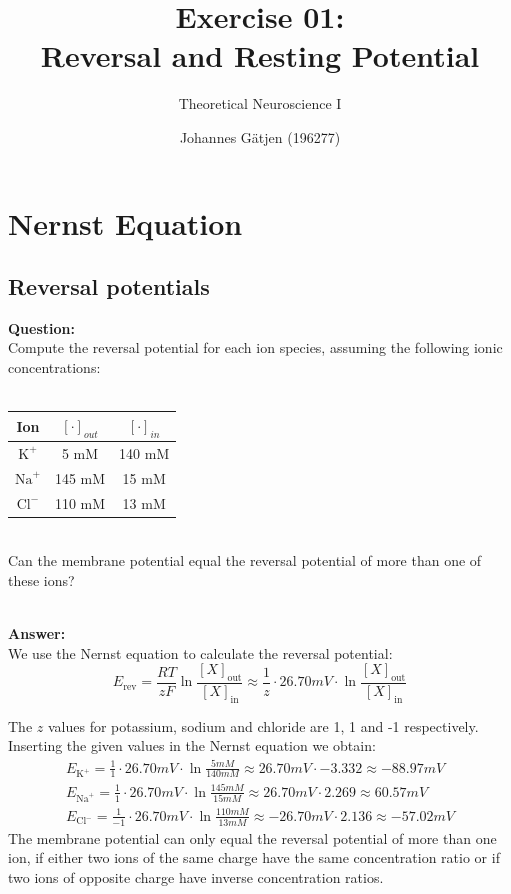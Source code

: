 \documentclass{scrartcl}
\title{Exercise 01:\\Reversal and Resting Potential}
\subtitle{Theoretical Neuroscience I}
\author{Johannes G\"atjen (196277)}
\newcommand\Answer{%
  \textbf{\\Answer:}%
}
\newcommand\Question{%
  \textbf{Question:}%
}
\begin{document}
\maketitle

\section{Nernst Equation}
\subsection{Reversal potentials}

\Question\\
Compute the reversal potential for each ion species, assuming the following ionic concentrations:\\
\\
\begin{tabular}{c | c c}
Ion & $[\cdot]_{out}$ & $[\cdot]_{in}$ \\ \hline
$\text{K}^+$ & 5 mM & 140 mM \\
$\text{Na}^+$ & 145 mM & 15 mM \\
$\text{Cl}^-$ & 110 mM & 13 mM
\end{tabular}\\
Can the membrane potential equal the reversal potential of more than one of these ions?

\Answer\\
We use the Nernst equation to calculate the reversal potential:
\begin{equation*}
E_{\text{rev}}=\frac{RT}{zF}\ln \frac{[X]_{\text{out}}}{[X]_{\text{in}}} \approx \frac{1}{z} \cdot 26.70 \si{mV} \cdot \ln \frac{[X]_{\text{out}}}{[X]_{\text{in}}}
\end{equation*}

The $z$ values for potassium, sodium and chloride are 1, 1 and -1 respectively. Inserting the given values in the Nernst equation we obtain:
\begin{equation*}
\begin{split}
E_{\text{K}^+}=\frac{1}{1} \cdot 26.70 \si{mV} \cdot \ln \frac{5 \si{mM}}{140 \si{mM}} \approx 26.70 \si{mV} \cdot -3.332 \approx -88.97 \si{mV}\\
E_{\text{Na}^+}=\frac{1}{1} \cdot 26.70 \si{mV} \cdot \ln \frac{145 \si{mM}}{15 \si{mM}} \approx 26.70 \si{mV} \cdot 2.269 \approx 60.57 \si{mV}\\
E_{\text{Cl}^-}=\frac{1}{-1} \cdot 26.70 \si{mV} \cdot \ln \frac{110 \si{mM}}{13 \si{mM}} \approx {-26.70} \si{mV} \cdot 2.136 \approx -57.02 \si{mV}
\end{split}
\end{equation*}
The membrane potential can only equal the reversal potential of more than one ion, if either two ions of the same charge have the same concentration ratio or if two ions of opposite charge have inverse concentration ratios.
\pagebreak
\end{document}
